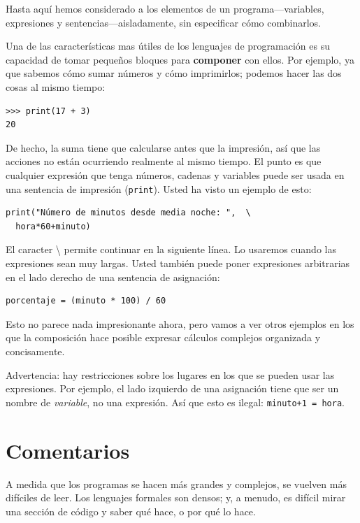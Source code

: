 
Hasta aquí hemos considerado a los elementos de un programa—variables,
expresiones y sentencias—aisladamente, sin especificar cómo combinarlos.

Una de las características mas útiles de los lenguajes de programación
es su capacidad de tomar pequeños bloques para \textbf{componer} con
ellos. Por ejemplo, ya que sabemos cómo sumar números y cómo imprimirlos;
podemos hacer las dos cosas al mismo tiempo:

\begin{verbatim}
>>> print(17 + 3)
20
\end{verbatim}
De hecho, la suma tiene que calcularse antes que la impresión, así
que las acciones no están ocurriendo realmente al mismo tiempo. El
punto es que cualquier expresión que tenga números, cadenas y variables
puede ser usada en una sentencia de impresión (\texttt{print}). Usted
ha visto un ejemplo de esto:

\begin{verbatim}
print("Número de minutos desde media noche: ",  \
  hora*60+minuto)
\end{verbatim}
El caracter \textbackslash{} permite continuar en la siguiente línea.
Lo usaremos cuando las expresiones sean muy largas. Usted también
puede poner expresiones arbitrarias en el lado derecho de una sentencia
de asignación:

\begin{verbatim}
porcentaje = (minuto * 100) / 60
\end{verbatim}
Esto no parece nada impresionante ahora, pero vamos a ver otros ejemplos
en los que la composición hace posible expresar cálculos complejos
organizada y concisamente.

Advertencia: hay restricciones sobre los lugares en los que se pueden
usar las expresiones. Por ejemplo, el lado izquierdo de una asignación
tiene que ser un nombre de {\em variable}, no una expresión. Así
que esto es ilegal: \texttt{minuto+1 = hora}.

\section{Comentarios}


A medida que los programas se hacen más grandes y complejos, se vuelven
más difíciles de leer. Los lenguajes formales son densos; y, a menudo,
es difícil mirar una sección de código y saber qué hace, o por qué
lo hace.

